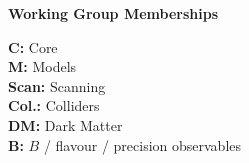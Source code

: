 \newpage
\centerline{\textbf{Working Group Memberships}}\bigskip

\noindent\textbf{C:} Core\\
\noindent\textbf{M:} Models\\
\noindent\textbf{Scan:} Scanning\\
\noindent\textbf{Col.:} Colliders\\
\noindent\textbf{DM:} Dark Matter\\
\noindent\textbf{B:} $B$ / flavour / precision observables

\bigskip

\newcommand{\C}{\textbf{C}}            %
\newcommand{\M}{$\bullet$}             %
\newlength{\Mwidth} \settowidth{\Mwidth}{\M}
\newcommand{\E}{\makebox[\Mwidth]{}}   %
